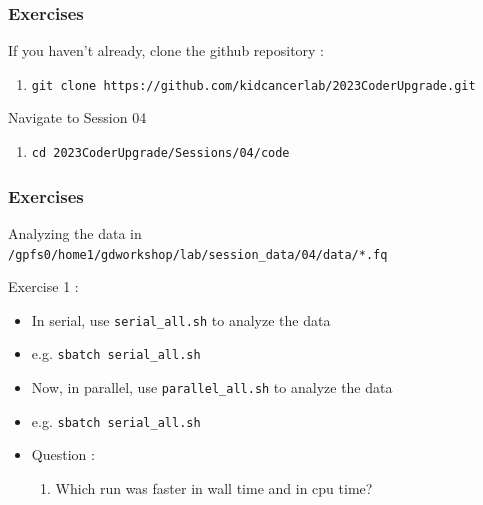 \documentclass{beamer}
\newcommand{\code}[1]{\colorbox{codegray}{\texttt{#1}}}
\begin{document}
%
\begin{frame}
\frametitle{Exercises}
If you haven't already, clone the github repository : 
\pause
\begin{enumerate}
    \item \code{\scriptsize git clone https://github.com/kidcancerlab/2023CoderUpgrade.git}
    \pause
\end{enumerate}
Navigate to Session 04
\begin{enumerate}
    \item \code{\scriptsize cd 2023CoderUpgrade/Sessions/04/code}
\end{enumerate}
\end{frame}



\begin{frame}
\frametitle{Exercises}
Analyzing the data in \code{\scriptsize /gpfs0/home1/gdworkshop/lab/session\_data/04/data/*.fq}
\bigskip

Exercise 1 : 
\begin{itemize}
        \item In serial, use \code{\scriptsize serial\_all.sh} to analyze the data
        \pause
        \item e.g. \code{\scriptsize sbatch serial\_all.sh}
        \pause
        \item Now, in parallel, use \code{\scriptsize parallel\_all.sh} to analyze the data
        \pause
        \item e.g. \code{\scriptsize sbatch serial\_all.sh}
        \pause
        \item Question :
        \begin{enumerate}
            \item  Which run was faster in wall time and in cpu time?
        \end{enumerate}
\end{itemize}
\end{frame}
\end{document}
